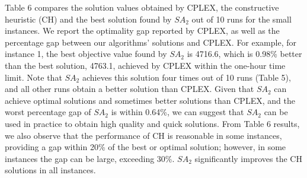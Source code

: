 \documentclass[11pt]{article}
\begin{document}




Table 6 compares the solution values obtained by CPLEX, the constructive heuristic (CH) and the best solution found by $SA_{2}$ out of 10 runs for the small instances. We report the optimality gap reported by CPLEX, as well as the percentage gap between our algorithms' solutions and CPLEX. For example, for instance 1, the best objective value found by $SA_{2}$ is 4716.6, which is 0.98\% better than the best solution, 4763.1, achieved by CPLEX within the one-hour time limit. Note that $SA_{2}$ achieves this solution four times out of 10 runs (Table 5), and all other runs obtain a better solution than CPLEX. Given that $SA_{2}$ can achieve optimal solutions and sometimes better solutions than CPLEX, and the worst percentage gap of $SA_{2}$ is within 0.64\%, we can suggest that $SA_{2}$ can be used in practice to obtain high quality and quick solutions. From Table 6 results, we also observe that the performance of CH is reasonable in some instances, providing a gap within 20\% of the best or optimal solution; however, in some instances the gap can be large, exceeding 30\%. $SA_2$ significantly improves the CH solutions in all instances.
\end{document}

